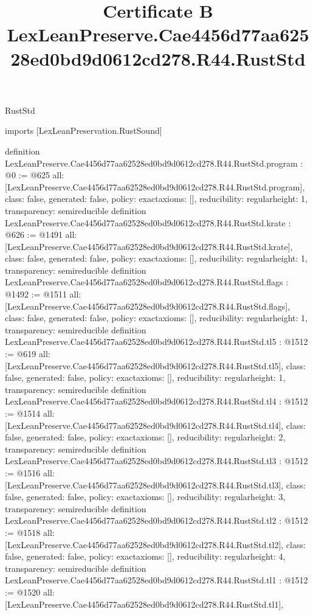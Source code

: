 \begin{lexlean}{RustStd}
\title{Certificate B LexLeanPreserve.Cae4456d77aa62528ed0bd9d0612cd278.R44.RustStd}
\begin{coremodule}
imports [LexLeanPreservation.RustSound]

definition LexLeanPreserve.Cae4456d77aa62528ed0bd9d0612cd278.R44.RustStd.program : @0 := @625 {
  all: [LexLeanPreserve.Cae4456d77aa62528ed0bd9d0612cd278.R44.RustStd.program],
  class: false,
  generated: false,
  policy: exact{axioms: []},
  reducibility: regular{height: 1},
  transparency: semireducible
}
definition LexLeanPreserve.Cae4456d77aa62528ed0bd9d0612cd278.R44.RustStd.krate : @626 := @1491 {
  all: [LexLeanPreserve.Cae4456d77aa62528ed0bd9d0612cd278.R44.RustStd.krate],
  class: false,
  generated: false,
  policy: exact{axioms: []},
  reducibility: regular{height: 1},
  transparency: semireducible
}
definition LexLeanPreserve.Cae4456d77aa62528ed0bd9d0612cd278.R44.RustStd.flags : @1492 := @1511 {
  all: [LexLeanPreserve.Cae4456d77aa62528ed0bd9d0612cd278.R44.RustStd.flags],
  class: false,
  generated: false,
  policy: exact{axioms: []},
  reducibility: regular{height: 1},
  transparency: semireducible
}
definition LexLeanPreserve.Cae4456d77aa62528ed0bd9d0612cd278.R44.RustStd.tl5 : @1512 := @619 {
  all: [LexLeanPreserve.Cae4456d77aa62528ed0bd9d0612cd278.R44.RustStd.tl5],
  class: false,
  generated: false,
  policy: exact{axioms: []},
  reducibility: regular{height: 1},
  transparency: semireducible
}
definition LexLeanPreserve.Cae4456d77aa62528ed0bd9d0612cd278.R44.RustStd.tl4 : @1512 := @1514 {
  all: [LexLeanPreserve.Cae4456d77aa62528ed0bd9d0612cd278.R44.RustStd.tl4],
  class: false,
  generated: false,
  policy: exact{axioms: []},
  reducibility: regular{height: 2},
  transparency: semireducible
}
definition LexLeanPreserve.Cae4456d77aa62528ed0bd9d0612cd278.R44.RustStd.tl3 : @1512 := @1516 {
  all: [LexLeanPreserve.Cae4456d77aa62528ed0bd9d0612cd278.R44.RustStd.tl3],
  class: false,
  generated: false,
  policy: exact{axioms: []},
  reducibility: regular{height: 3},
  transparency: semireducible
}
definition LexLeanPreserve.Cae4456d77aa62528ed0bd9d0612cd278.R44.RustStd.tl2 : @1512 := @1518 {
  all: [LexLeanPreserve.Cae4456d77aa62528ed0bd9d0612cd278.R44.RustStd.tl2],
  class: false,
  generated: false,
  policy: exact{axioms: []},
  reducibility: regular{height: 4},
  transparency: semireducible
}
definition LexLeanPreserve.Cae4456d77aa62528ed0bd9d0612cd278.R44.RustStd.tl1 : @1512 := @1520 {
  all: [LexLeanPreserve.Cae4456d77aa62528ed0bd9d0612cd278.R44.RustStd.tl1],
}
\end{coremodule}
\end{lexlean}
